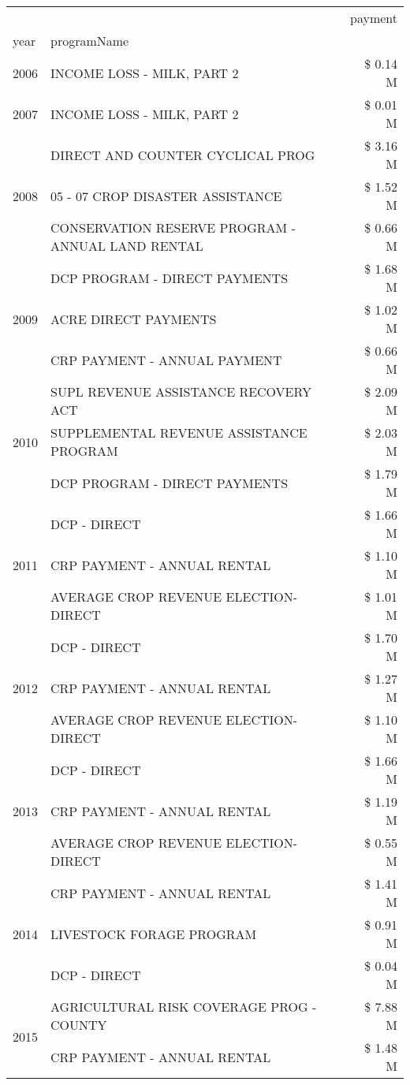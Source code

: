 \begin{tabular}{llr}
\toprule
 &  & payment \\
year & programName &  \\
\midrule
2006 & INCOME LOSS - MILK, PART 2 & \$ 0.14 M \\
\cline{1-3}
2007 & INCOME LOSS - MILK, PART 2 & \$ 0.01 M \\
\cline{1-3}
\multirow[t]{3}{*}{2008} & DIRECT AND COUNTER CYCLICAL PROG & \$ 3.16 M \\
 & 05 - 07 CROP DISASTER ASSISTANCE & \$ 1.52 M \\
 & CONSERVATION RESERVE PROGRAM - ANNUAL LAND RENTAL & \$ 0.66 M \\
\cline{1-3}
\multirow[t]{3}{*}{2009} & DCP PROGRAM - DIRECT PAYMENTS & \$ 1.68 M \\
 & ACRE DIRECT PAYMENTS & \$ 1.02 M \\
 & CRP PAYMENT - ANNUAL PAYMENT & \$ 0.66 M \\
\cline{1-3}
\multirow[t]{3}{*}{2010} & SUPL REVENUE ASSISTANCE RECOVERY ACT & \$ 2.09 M \\
 & SUPPLEMENTAL REVENUE ASSISTANCE PROGRAM & \$ 2.03 M \\
 & DCP PROGRAM - DIRECT PAYMENTS & \$ 1.79 M \\
\cline{1-3}
\multirow[t]{3}{*}{2011} & DCP - DIRECT & \$ 1.66 M \\
 & CRP PAYMENT - ANNUAL RENTAL & \$ 1.10 M \\
 & AVERAGE CROP REVENUE ELECTION-DIRECT & \$ 1.01 M \\
\cline{1-3}
\multirow[t]{3}{*}{2012} & DCP - DIRECT & \$ 1.70 M \\
 & CRP PAYMENT - ANNUAL RENTAL & \$ 1.27 M \\
 & AVERAGE CROP REVENUE ELECTION-DIRECT & \$ 1.10 M \\
\cline{1-3}
\multirow[t]{3}{*}{2013} & DCP - DIRECT & \$ 1.66 M \\
 & CRP PAYMENT - ANNUAL RENTAL & \$ 1.19 M \\
 & AVERAGE CROP REVENUE ELECTION-DIRECT & \$ 0.55 M \\
\cline{1-3}
\multirow[t]{3}{*}{2014} & CRP PAYMENT - ANNUAL RENTAL & \$ 1.41 M \\
 & LIVESTOCK FORAGE PROGRAM & \$ 0.91 M \\
 & DCP - DIRECT & \$ 0.04 M \\
\cline{1-3}
\multirow[t]{3}{*}{2015} & AGRICULTURAL RISK COVERAGE PROG - COUNTY & \$ 7.88 M \\
 & CRP PAYMENT - ANNUAL RENTAL & \$ 1.48 M \\

\end{tabular}
